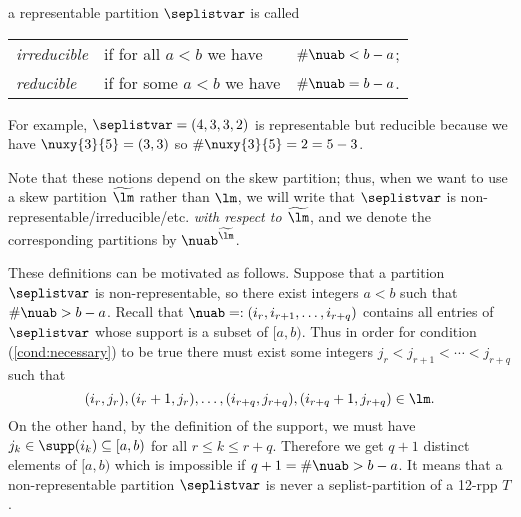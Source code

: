 \documentclass[numbers=enddot,12pt,final,onecolumn,notitlepage]{scrartcl}%
\theoremstyle{definition}
\begin{document}
a representable partition $\seplistvar$ is called

\begin{tabular}{@{$\bullet$ }lll} 
 \textit{irreducible}& if for all  $a<b$ we have &$\#\nuab < b-a$;\\
 \textit{reducible} &if for some $a<b$ we have &$\#\nuab=b-a$.
\end{tabular}

For example, $\seplistvar=(4,3,3,2)$ is representable but reducible because we have $\nuxy{3}{5}=(3,3)$ so $\#\nuxy{3}{5}=2=5-3$.

Note that these notions depend on the skew partition; thus, when we want to use a skew partition $\widetilde\lm$ rather than $\lm$, we will write that $\seplistvar$ is non-representable/irreducible/etc. \textit{with respect to $\widetilde\lm$}, and we denote the corresponding partitions by $\nuab^{\widetilde{\lm}}$.

These definitions can be motivated as follows. Suppose that a partition $\seplistvar$ is non-representable, so there exist integers $a<b$ such that $\#\nuab>b-a$. Recall that $\nuab=:(i_r,i_{r+1},\dots,i_{r+q})$ contains all entries of $\seplistvar$ whose support is a subset of $[a,b)$. Thus in order for condition (\ref{cond:necessary}) to be true there must exist some integers $j_r<j_{r+1}<\cdots<j_{r+q}$ such that 
$$(i_r, j_r),(i_r+1, j_r),\dots,(i_{r+q},j_{r+q}),(i_{r+q}+1,j_{r+q})\in\lm.$$
On the other hand, by the definition of the support, we must have $j_k\in \supp(i_k)\subseteq [a,b)$ for all $r\leq k\leq r+q$. Therefore we get $q+1$ distinct elements of $[a,b)$ which is impossible if $q+1=\#\nuab>b-a$. It means that a non-representable partition $\seplistvar$ is never a seplist-partition of a 12-rpp $T$. 
\end{document}
